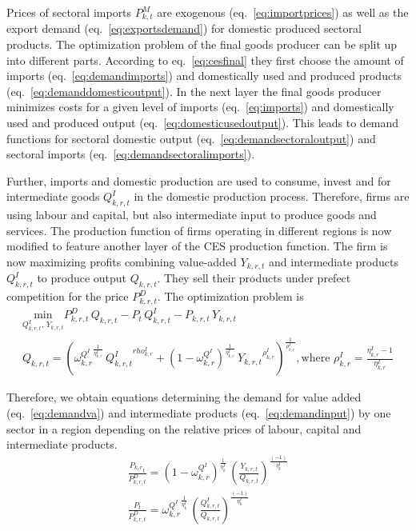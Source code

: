 \documentclass[10pt,a4paper]{article}
\begin{document}
Prices of sectoral imports $P^{M}_{k,t}$ are exogenous (eq.~\eqref{eq:importprices}) as well as the export demand (eq.~\eqref{eq:exportsdemand}) for domestic produced sectoral products. The optimization problem of the final goods producer can be split up into different parts. According to eq.~\eqref{eq:cesfinal} they first choose the amount of imports (eq.~\eqref{eq:demandimports}) and domestically used and produced products (eq.~\eqref{eq:demanddomesticoutput}). In the next layer the final goods producer minimizes costs for a given level of imports (eq.~\eqref{eq:imports}) and domestically used and produced output (eq.~\eqref{eq:domesticusedoutput}). This leads to demand functions for sectoral domestic output (eq.~\eqref{eq:demandsectoraloutput}) and sectoral imports (eq.~\eqref{eq:demandsectoralimports}).

Further, imports and domestic production are used to consume, invest and for intermediate goods $Q^{I}_{k,r,t}$ in the domestic production process. Therefore, firms are using labour and capital, but also intermediate input to produce goods and services. The production function of firms operating in different regions is now modified to feature another layer of the CES production function. The firm is now maximizing profits combining value-added $Y_{k,r,t}$ and intermediate products $Q^{I}_{k,r,t}$ to produce output $Q_{k,r,t}$. They sell their products under prefect competition for the price $P^{D}_{k,r,t}$. The optimization problem is 
\begin{align}
\underset{Q^{I}_{k,r,t}, \, Y_{k,r,t}}{\mathrm{min}} P^{D}_{k,r,t} \, Q_{k,r,t} - P_{t} \, Q^{I}_{k,r,t} - P_{k,r,t} \, Y_{k,r,t} \nonumber \\
Q_{k,r,t} = \left({\omega^{Q^{I}}_{k,r}}^{\frac{1}{\eta^{I}_{k,r}}} \, {Q^{I}_{k,r,t}}^{rho^{I}_{k,r}} + (1 - \omega^{Q^{I}}_{k,r})^{\frac{1}{\eta^{I}_{k,r}}} \, {Y_{k,r,t}}^{\rho^{I}_{k,r}} \right)^{\frac{1}{\rho^I_{k,r}}}, \mbox{where } \rho^I_{k,r} = \frac{\eta^{I}_{k,r} - 1}{\eta^{I}_{k,r}}
\end{align}

Therefore, we obtain equations determining the demand for value added (eq.~\eqref{eq:demandva}) and intermediate products (eq.~\eqref{eq:demandinput}) by one sector in a region depending on the relative prices of labour, capital and intermediate products.
\begin{align}
\frac{{{P_{k,r}}_{t}}}{{P^{D}_{k,r,t}}}=\left(1 - {\omega^{Q^{I}}_{k,r}}\right)^{\frac{1}{{{\eta^{I}_{k}}}}} \, \left(\frac{Y_{k,r,t}}{Q_{k,r,t}}\right)^{\frac{\left(-1\right)}{{{\eta^{I}_{k}}}}} \label{eq:demandva}\\
\frac{{P_{t}}}{{P^{D}_{k,r,t}}}={\omega^{Q^{I}}_{k,r}}^{\frac{1}{{{\eta^{I}_{k}}}}} \, \left(\frac{Q^{I}_{k,r,t}}{Q_{k,r,t}}\right)^{\frac{\left(-1\right)}{{{\eta^{I}_{k}}}}} \label{eq:demandinput}
\end{align}
\end{document}
